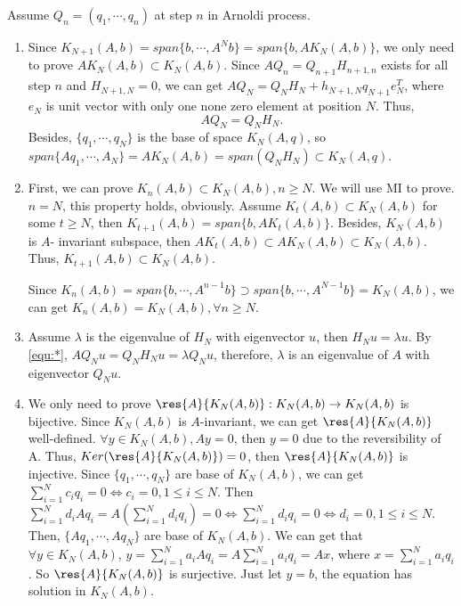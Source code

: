 \documentclass{ctexart}
\begin{document}
\begin{solution}
  Assume \(Q_n =(q_1,\cdots,q_n)\) at step \(n \) in Arnoldi process.
  \begin{enumerate}
    \item Since \(K_{N + 1}(A,b)=span\{b,\cdots,A^Nb\}=span\{b,AK_N(A,b)\} \), we only need to prove \(AK_N(A,b) \subset K_N(A,b) \).
      Since \(AQ_n=Q_{n + 1} H_{n + 1,n} \) exists for all step \(n \) and \(H_{N + 1,N}=0 \), we can get \(AQ_N=Q_N H_{N} + h_{N + 1,N}q_{N + 1} e_N^T \), where \(e_N \)
      is unit vector with only one none zero element at position \(N \). Thus,
      \begin{equation}\label{equ:*}
        AQ_N=Q_N H_N .
      \end{equation}
      Besides, \(\{q_1,\cdots,q_N\} \) is the base of space \(K_N(A,q) \), so \(span\{Aq_1,\cdots,A_{N}\} = A K_N(A,b) =span(Q_N H_N)\subset K_N(A,q) \).
    \item First, we can prove \(K_{n}(A,b) \subset K_{N}(A,b), n \geq N \). We will use MI to prove. \(n=N \), this property holds, obviously.
      Assume \(K_t(A,b) \subset K_N (A,b) \) for some \(t \geq N \), then \(K_{t + 1}(A,b)=span\{b,AK_t(A,b)\} \).
      Besides, \(K_N(A,b) \) is \(A \)- invariant subspace, then \(A K_t(A,b) \subset A K_N(A,b) \subset K_N(A,b) \).
      Thus, \(K_{t + 1}(A,b) \subset K_N(A,b) \).

      Since \(K_n(A,b) =span\{b,\cdots,A^{n-1}b\} \supset span\{b,\cdots,A^{N-1}b\}=K_N(A,b) \), we can get \(K_n(A,b)=K_N(A,b) ,\forall n \geq N\).
    \item Assume \(\lambda \) is the eigenvalue of \(H_N \) with eigenvector \(u \), then \(H_N u=\lambda u \).
      By \eqref{equ:*}, \(AQ_N u=Q_N H_N u= \lambda  Q_N u \), therefore, \(\lambda \) is an eigenvalue of \(A \) with eigenvector \(Q_N u \).
    \item We only need to prove \(\res{A}{K_N(A,b)}: K_N(A,b) \to K_N(A,b)\) is bijective. Since \(K_N(A,b) \) is \(A \)-invariant, we can get \(\res{A}{K_N(A,b)} \) well-defined.
      \(\forall y \in K_N(A,b), Ay =0 \), then \(y=0 \) due to the reversibility of A.
      Thus, \(Ker(\res{A}{K_N(A,b)})=0 \), then \(\res{A}{K_N(A,b)}\) is injective.
      Since \(\{q_1,\cdots,q_N\} \) are base of \(K_N(A,b) \), we can get \(\sum_{i=1}^{N}c_iq_i=0 \iff c_i=0, 1 \leq i \leq N \). Then \(\sum_{i=1}^{N}d_i Aq_i=A(\sum_{i=1}^{N}d_i q_i)=0 \iff \sum_{i=1}^{N} d_i q_i =0 \iff d_i=0, 1 \leq i \leq N \).
      Then, \(\{Aq_1,\cdots,Aq_N\} \) are base of \(K_N(A,b) \).
      We can get that \(\forall y \in K_N(A,b) \), \(y=\sum_{i=1}^{N} a_i Aq_i=A \sum_{i=1}^{N}a_iq_i=Ax \), where \(x= \sum_{i=1}^{N}a_iq_i \). So \(\res{A}{K_N(A,b)} \) is surjective.
      Just let \(y=b \), the equation has solution in \(K_N(A,b) \).
  \end{enumerate}
\end{solution}
\end{document}
